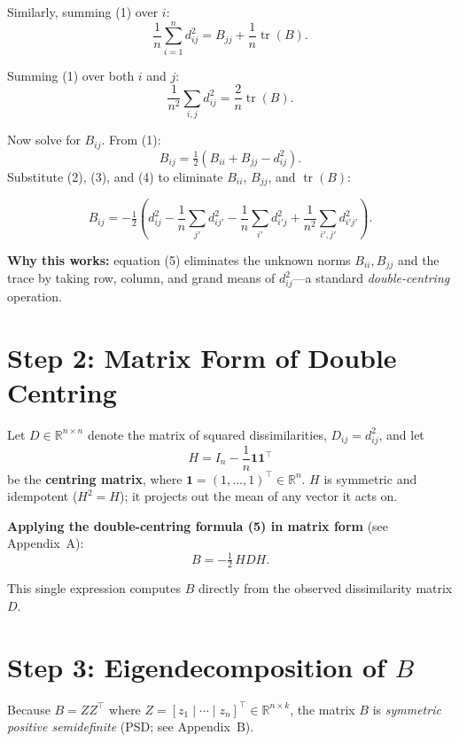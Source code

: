 \documentclass[11pt]{article}
\begin{document}
Similarly, summing (1) over $i$:
\[
  \frac{1}{n}\sum_{i=1}^{n} d_{ij}^{2}
    = B_{jj} + \frac{1}{n}\operatorname{tr}(B).  \tag{3}
\]

Summing (1) over both $i$ and $j$:
\[
  \frac{1}{n^2}\sum_{i,j} d_{ij}^{2}
    = \frac{2}{n}\operatorname{tr}(B).            \tag{4}
\]

Now solve for $B_{ij}$.  From (1):
\[
  B_{ij} = \tfrac{1}{2}\!\left(B_{ii}+B_{jj}-d_{ij}^{2}\right).
\]
Substitute (2), (3), and (4) to eliminate $B_{ii}$, $B_{jj}$, and
$\operatorname{tr}(B)$:

\[
  B_{ij}
  = -\tfrac{1}{2}
    \!\left(
      d_{ij}^{2}
      - \frac{1}{n}\sum_{j'}d_{ij'}^{2}
      - \frac{1}{n}\sum_{i'}d_{i'j}^{2}
      + \frac{1}{n^2}\sum_{i',j'}d_{i'j'}^{2}
    \right).   \tag{5}
\]

\textbf{Why this works:} equation (5) eliminates the unknown norms
$B_{ii}, B_{jj}$ and the trace by taking row, column, and grand means of
$d_{ij}^{2}$—a standard \emph{double-centring} operation.

\section*{Step 2: Matrix Form of Double Centring}

Let $D \in \mathbb{R}^{n\times n}$ denote the matrix of squared
dissimilarities, $D_{ij} = d_{ij}^{2}$, and let
\[
  H = I_n - \frac{1}{n}\mathbf{1}\mathbf{1}^{\top}
\]
be the \textbf{centring matrix}, where $\mathbf{1} = (1,\dots,1)^{\top}
\in \mathbb{R}^n$.  $H$ is symmetric and idempotent ($H^2=H$); it
projects out the mean of any vector it acts on.

\textbf{Applying the double-centring formula (5) in matrix form}
(see Appendix~A):
\[
  \boxed{B = -\tfrac{1}{2}\,H D H.}   \tag{6}
\]

This single expression computes $B$ directly from the observed
dissimilarity matrix $D$.

\section*{Step 3: Eigendecomposition of $B$}

Because $B = Z Z^{\top}$ where $Z = [z_1 \mid \cdots \mid z_n]^{\top}
\in \mathbb{R}^{n\times k}$, the matrix $B$ is \emph{symmetric positive
semidefinite} (PSD; see Appendix~B).
\end{document}

